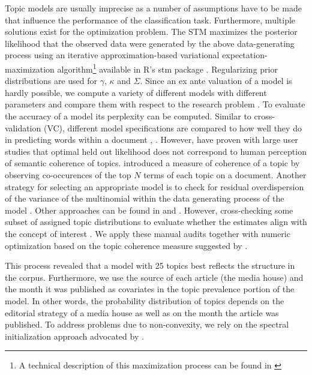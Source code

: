 \documentclass[12pt,a4paper,notitlepage]{article}
\begin{document}
Topic models are usually imprecise as a number of assumptions have to be made that influence the performance of the classification task. Furthermore, multiple solutions exist for the optimization problem. The STM maximizes the posterior likelihood that the observed data were generated by the above data-generating process using an iterative approximation-based variational expectation-maximization algorithm\footnote{A technical description of this maximization process can be found in \citet{roberts_model_2016}} available in R's stm package \citep{roberts_stm:_2016}. Regularizing prior distributions are used for $\gamma$, $\kappa$ and $\Sigma$. Since an ex ante valuation of a model is hardly possible, we compute a variety of different models with different parameters and compare them with respect to the research problem \citep{gentzkow_text_2017}. To evaluate the accuracy of a model its perplexity can be computed. Similar to cross-validation (VC), different model specifications are compared to how well they do in predicting words within a document \citep{asuncion_smoothing_2012}, \citep{wallach_evaluation_2009}. However, \citet{chang_reading_2009} have proven with large user studies that optimal held out likelihood does not correspond to human perception of semantic coherence of topics. \cite{mimno_optimizing_2011} introduced a measure of coherence of a topic by observing co-occurences of the top $N$ terms of each topic on a document. Another strategy for selecting an appropriate model is to check for residual overdispersion of the variance of the multinomial within the data generating process of the model \citep{taddy_estimation_2012}. Other approaches can be found in \citet{airoldi_reconceptualizing_2010} and \citet{teh_hierarchical_2006}. However, cross-checking some subset of assigned topic distributions to evaluate whether the estimates align with the concept of interest \citep{gentzkow_text_2017}. We apply these manual audits together with numeric optimization based on the topic coherence measure suggested by \citet{mimno_optimizing_2011}. 

This process revealed that a model with 25 topics best reflects the structure in the corpus. Furthermore, we use the source of each article (the media house) and the month it was published as covariates in the topic prevalence portion of the model. In other words, the probability distribution of topics depends on the editorial strategy of a media house as well as on the month the article was published. To address problems due to non-convexity, we rely on the spectral initialization approach advocated by \citet{roberts_navigating_2016}. 
\end{document}
